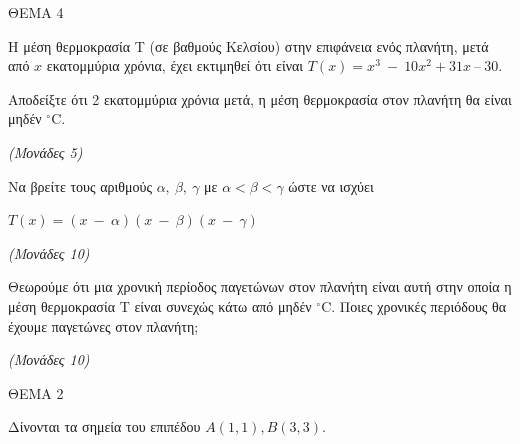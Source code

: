 \documentclass[11pt,a4paper,twoside]{book}
\newcommand{\monades}[1]{\hfill \textit{(Μονάδες #1)}}
\begin{document}
\vspace{4mm}

ΘΕΜΑ 4

Η μέση θερμοκρασία Τ (σε βαθμούς Κελσίου) στην επιφάνεια ενός πλανήτη, μετά από $x$ εκατομμύρια χρόνια, έχει εκτιμηθεί ότι είναι $T(x) = x^{3}\  - \ 10x^{2} + 31x\ –\ 30$.

\begin{alist}
\item Αποδείξτε ότι 2 εκατομμύρια χρόνια μετά, η μέση θερμοκρασία στον πλανήτη θα είναι μηδέν $^\circ\text{C}$.

\monades{5}

\item Να βρείτε τους αριθμούς $\alpha,\ \beta,\ \gamma$ με $\alpha < \beta < \gamma$ ώστε να ισχύει

$Τ(x) = (x\  - \ \alpha)(x\  - \ \beta)(x\  - \ \gamma)$

\monades{10}

\item Θεωρούμε ότι μια χρονική περίοδος παγετώνων στον πλανήτη είναι αυτή στην οποία η μέση θερμοκρασία Τ είναι συνεχώς κάτω από μηδέν $^\circ\text{C}$. Ποιες χρονικές περιόδους θα έχουμε παγετώνες στον πλανήτη;

\monades{10}
\end{alist}

\vspace{4mm}

ΘΕΜΑ 2

Δίνονται τα σημεία του επιπέδου $Α(1,1),Β(3,3).$
\end{document}
